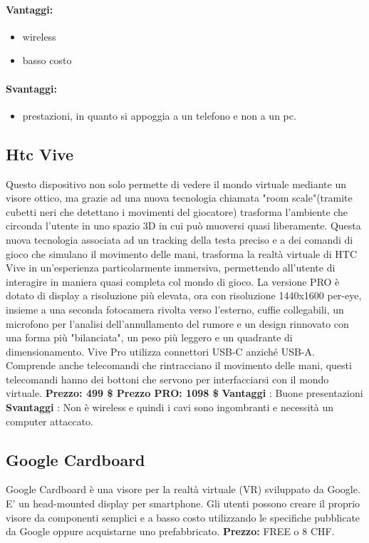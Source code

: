 \documentclass[8pt]{extarticle}
\begin{document}
\begin{multicols}{3}
\paragraph{Vantaggi:}
\begin{itemize}
    \item wireless
    \item basso costo
\end{itemize}
\paragraph{Svantaggi:}
\begin{itemize}
    \item prestazioni, in quanto si appoggia a un telefono e non a un pc.
\end{itemize}
\subsection{Htc Vive}
Questo dispositivo non solo permette di vedere il mondo virtuale mediante un visore ottico, ma grazie ad una nuova tecnologia chiamata "room scale"(tramite cubetti neri che detettano i movimenti del giocatore) trasforma l'ambiente che circonda l'utente in uno spazio 3D in cui può muoversi quasi liberamente. Questa nuova tecnologia associata ad un tracking della testa preciso e a dei comandi di gioco che simulano il movimento delle mani, trasforma la realtà virtuale di HTC Vive in un'esperienza particolarmente immersiva, permettendo all'utente di interagire in maniera quasi completa col mondo di gioco.
La versione PRO è dotato di display a risoluzione più elevata, ora con risoluzione 1440x1600 per-eye, insieme a una seconda fotocamera rivolta verso l'esterno, cuffie collegabili, un microfono per l'analisi dell'annullamento del rumore e un design rinnovato con una forma più "bilanciata", un peso più leggero e un quadrante di dimensionamento. Vive Pro utilizza connettori USB-C anziché USB-A. Comprende anche telecomandi che rintracciano il movimento delle mani, questi telecomandi hanno dei bottoni che servono per interfacciarsi con il mondo virtuale.
\textbf{Prezzo: 499 \$ Prezzo PRO: 1098 \$}
\textbf{Vantaggi} : Buone presentazioni
\textbf{Svantaggi} : Non è wireless e quindi i cavi sono ingombranti e necessità un computer attaccato.
\subsection{Google Cardboard}
Google Cardboard è una visore per la realtà virtuale (VR) sviluppato da Google. E' un head-mounted display per smartphone.  Gli utenti possono creare il proprio visore da componenti semplici e a basso costo utilizzando le specifiche pubblicate da Google oppure acquistarne uno prefabbricato. 
\textbf{Prezzo:} FREE o 8 CHF.

\end{multicols}
\end{document}
